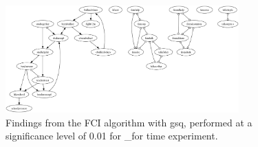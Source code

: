 \begin{figure}[htbp]
    \centering
    \includegraphics[width=0.8\textwidth]{Report/final_report/pictures/FCI_gsq_0.01__for time experiment.png}
    \caption{Findings from the FCI algorithm with gsq, performed at a significance level of 0.01 for _for time experiment.}
    \label{fig:fci_gsq_0.01_for time experiment}
\end{figure}

